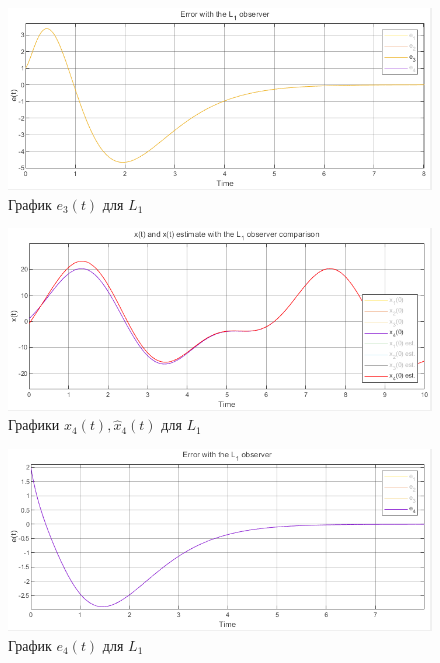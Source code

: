 \documentclass[a4paper, 12pt]{article}
\begin{document}
    \newpage
    \vspace*{5mm}
    \begin{figure}[H]
        \centering
        \includegraphics[scale=0.7]{2task_e3_L1.png}
        \captionsetup{skip=0pt}
        \caption{График $e_3(t)$ для $L_1$}
        \label{fig:2task_e3_L1}
    \end{figure}
    \begin{figure}[H]
        \centering
        \includegraphics[scale=0.7]{2task_x4comp_L1.png}
        \captionsetup{skip=0pt}
        \caption{Графики $x_4(t),\hat{x}_4(t)$ для $L_1$}
        \label{fig:2task_x4comp_L1}
    \end{figure}
    \begin{figure}[H]
        \centering
        \includegraphics[scale=0.7]{2task_e4_L1.png}
        \captionsetup{skip=0pt}
        \caption{График $e_4(t)$ для $L_1$}
        \label{fig:2task_e4_L1}
    \end{figure}
\end{document}
